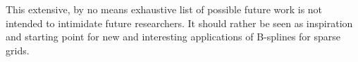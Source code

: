   
  
  
  
  
  
  
  

This extensive, by no means exhaustive list of possible future work is not
intended to intimidate future researchers.
It should rather be seen as inspiration and starting point
for new and interesting applications of B-splines for sparse grids.


\cleardoublepage

